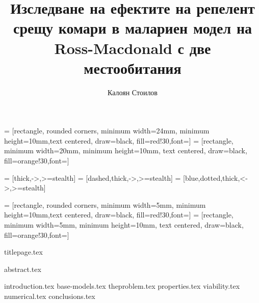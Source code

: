 \documentclass[bulgarian, 12pt]{article}
\title{Изследване на ефектите на репелент срещу комари в малариен модел на Ross-Macdonald с две местообитания}
\author{Калоян Стоилов}
\theoremstyle{definition}
\begin{document}

\usetikzlibrary{shapes,fit}
\tikzset{>=latex}
\usetikzlibrary{shapes.geometric, arrows.meta}

 = [rectangle, rounded corners, minimum width=24mm, minimum height=10mm,text centered, draw=black, fill=red!30,font=\small ]
 = [rectangle, minimum width=20mm, minimum height=10mm, text centered, draw=black, fill=orange!30,font=\small ]

 = [thick,->,>=stealth]
 = [dashed,thick,->,>=stealth]
 = [blue,dotted,thick,<->,>=stealth]

 = [rectangle, rounded corners, minimum width=5mm, minimum height=10mm,text centered, draw=black, fill=red!30,font=\small ]
 = [rectangle, minimum width=5mm, minimum height=10mm, text centered, draw=black, fill=orange!30,font=\small ]

{titlepage.tex}

{abstract.tex}

\tableofcontents
\thispagestyle{empty}
\newpage
\setcounter{page}{1}
{introduction.tex}
{base-models.tex}
{theproblem.tex}
{properties.tex}
{viability.tex}
{numerical.tex}
{conclusions.tex}
\pagebreak
\nocite{*}
\renewcommand{\bibname}{\hspace{1em} Библиография} %


\end{document}
